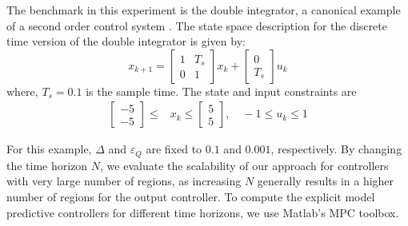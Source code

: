 The benchmark in this experiment is the double integrator, a canonical example
of a second order control system . The state space description
for the discrete time version of the double integrator is given by:
\begin{equation}
x_{k+1}=
\begin{bmatrix}
1 & T_s\\
0& 1	
\end{bmatrix}
x_k+
\begin{bmatrix}
0\\
T_s
\end{bmatrix}u_k
\label{eq:int2_ss}
\end{equation}
where, $T_s=0.1$ is the sample time. The state and input constraints are
\begin{align*}
	\begin{bmatrix}
		-5\\-5
	\end{bmatrix}\leq&
	x_k\leq
	\begin{bmatrix}
	5\\5
	\end{bmatrix}, \quad
	-1\leq u_k \leq 1
\end{align*}%


For this example, $\Delta$ and $\varepsilon_Q$ are fixed to $0.1$ and $0.001$,
respectively. By changing the time horizon $N$, we evaluate the scalability
of our approach for controllers with very large number of regions, as 
increasing $N$ generally results in a higher number of regions for the output controller. To
compute the explicit model predictive controllers for different time horizons,
we use Matlab's MPC toolbox. %
 

